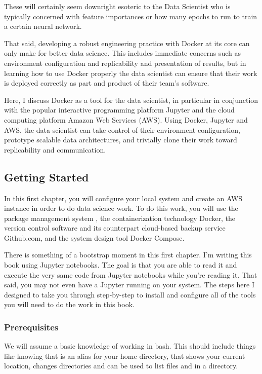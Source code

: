 \documentclass[letterpaper,10pt,english]{sphinxmanual}
\begin{document}
These will certainly seem downright esoteric to the Data Scientist who
is typically concerned with feature importances or how many epochs to
run to train a certain neural network.

That said, developing a robust engineering practice with Docker at its
core can only make for better data science. This includes immediate
concerns such as environment configuration and replicability and
presentation of results, but in learning how to use Docker properly the
data scientist can ensure that their work is deployed correctly as part
and product of their team’s software.

Here, I discuss Docker as a tool for the data scientist, in particular
in conjunction with the popular interactive programming platform Jupyter
and the cloud computing platform Amazon Web Services (AWS). Using
Docker, Jupyter and AWS, the data scientist can take control of their
environment configuration, prototype scalable data architectures, and
trivially clone their work toward replicability and communication.


\subsection{Getting Started}
\label{\detokenize{01-amazon-web-services:Getting-Started}}
In this first chapter, you will configure your local system and create
an AWS instance in order to do data science work. To do this work, you
will use the package management system , the containerization
technology Docker, the version control software  and its
counterpart cloud-based backup service Github.com, and the system design
tool Docker Compose.

There is something of a bootstrap moment in this first chapter. I’m
writing this book using Jupyter notebooks. The goal is that you are able
to read it and execute the very same code from Jupyter notebooks while
you’re reading it. That said, you may not even have a Jupyter running on
your system. The steps here I designed to take you through step-by-step
to install and configure all of the tools you will need to do the work
in this book.


\subsubsection{Prerequisites}
\label{\detokenize{01-amazon-web-services:Prerequisites}}
We will assume a basic knowledge of working in bash. This should include
things like knowing that \sphinxcode{\sphinxupquote{\textasciitilde{}}} is an alias for your home directory, that
 shows your current location,  changes directories and
 can be used to list files and in a directory.
\end{document}
